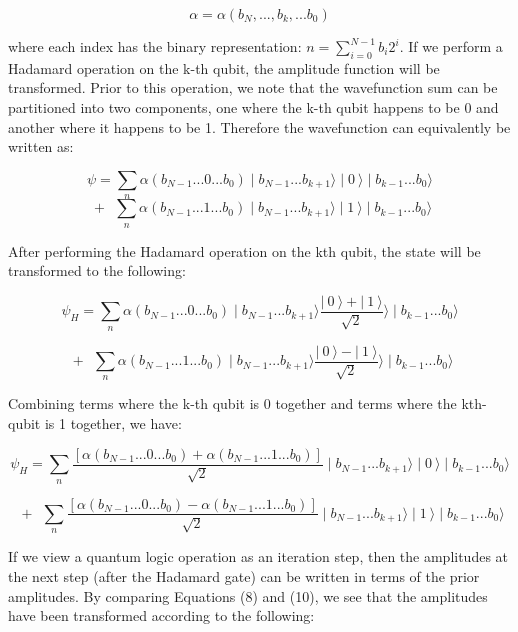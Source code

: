 \documentclass[reqno]{amsart}
\theoremstyle{definition}
\theoremstyle{remark}
\begin{document}
\begin{equation}
\alpha=\alpha(b_{N}, ... ,b_{k}, ...b_{0})
\end{equation}


\noindent
where each index has the binary representation: $n = \sum_{i=0}^{N-1} b_{i} 2^{i}$.
If we perform a Hadamard operation on the k-th qubit, the amplitude function will be transformed. Prior to this operation, 
we note that the wavefunction sum can be partitioned into two components, one where the k-th qubit happens to be 0 and another where it happens to be 1. 
Therefore the wavefunction can equivalently be written as:

\begin{equation}
\psi=\sum_{n} \alpha(b_{N-1}...0...b_{0})\mid b_{N-1}...b_{k+1}\rangle\mid0\:\rangle\mid b_{k-1}...b_{0}\rangle 
\end{equation}
$$
\: + \:\:\sum_{n} \alpha(b_{N-1}...1...b_{0})\mid b_{N-1}...b_{k+1}\rangle\mid1\:\rangle\mid b_{k-1}...b_{0}\rangle
$$

\noindent
After performing the Hadamard operation on the kth qubit, the state will be transformed to the following:

\begin{equation}
\psi_H=\sum_{n} \alpha(b_{N-1}...0...b_{0})\mid b_{N-1}...b_{k+1}\rangle\frac{|\:0\:\rangle+|\:1\:\rangle}{\sqrt{2}}\rangle\mid b_{k-1}...b_{0}\rangle 
\end{equation}

$$
\: + \:\:\sum_{n} \alpha(b_{N-1}...1...b_{0})\mid b_{N-1}...b_{k+1}\rangle\frac{|\:0\:\rangle-|\:1\:\rangle}{\sqrt{2}}\rangle\mid b_{k-1}...b_{0}\rangle
$$

\noindent
Combining terms where the k-th qubit is 0 together and terms where the kth-qubit is 1 together, we have:

\begin{equation}
\psi_H=\sum_{n} \frac{[\alpha(b_{N-1}...0...b_{0})+ \alpha(b_{N-1}...1...b_{0})]}{\sqrt{2}}\mid b_{N-1}...b_{k+1}\rangle\mid0\:\rangle\mid b_{k-1}...b_{0}\rangle
\end{equation}

$$
\: + \:\:\sum_{n} \frac{ [\alpha(b_{N-1}...0...b_{0})- \alpha(b_{N-1}...1...b_{0})]}{\sqrt{2}}\mid b_{N-1}...b_{k+1}\rangle\mid1\:\rangle\mid b_{k-1}...b_{0}\rangle
$$

\noindent
If we view a quantum logic operation as an iteration step, then the amplitudes at the next step (after the Hadamard gate) can be written in terms of the prior amplitudes. By comparing Equations (8) and (10), we see that the amplitudes have been transformed according to the following:
\end{document}
